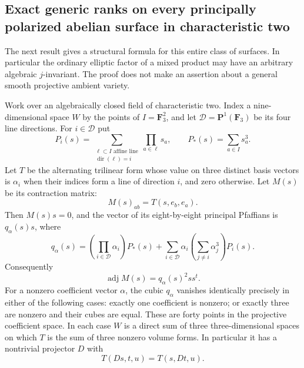 \subsection{Exact generic ranks on every principally polarized abelian surface in characteristic two}
\label{sec:DE-A3-ppav-ranks}

The next result gives a structural formula for this entire class of
surfaces.  In particular the ordinary elliptic factor of a mixed product
may have an arbitrary algebraic $j$-invariant.  The proof does not make
an assertion about a general smooth projective ambient variety.

\begin{lemma}
\label{lem:DE-A3-theta-pfaffian}
Work over an algebraically closed field of characteristic two.  Index a
nine-dimensional space $W$ by the points of $I=\mathbf F_3^2$, and let
$\mathcal D=\mathbf P^1(\mathbf F_3)$ be its four line directions.
For $i\in\mathcal D$ put
\[
 P_i(s)=\sum_{\substack{\ell\subset I\text{ affine line}\\
                         \operatorname{dir}(\ell)=i}}
                           \prod_{a\in\ell}s_a,
 \qquad P_*(s)=\sum_{a\in I}s_a^3.
\]
Let $T$ be the alternating trilinear form whose value on three distinct
basis vectors is $\alpha_i$ when their indices form a line of direction
$i$, and zero otherwise.  Let $M(s)$ be its contraction matrix:
\[
             M(s)_{ab}=T(s,e_b,e_a).
\]
Then $M(s)s=0$, and the vector of its eight-by-eight principal
Pfaffians is $q_\alpha(s)s$, where
\begin{equation}\label{eq:DE-A3-pfaffian-cubic}
 q_\alpha(s)=
   \left(\prod_{i\in\mathcal D}\alpha_i\right)P_*(s)
   +\sum_{i\in\mathcal D}
       \alpha_i\left(\sum_{j\ne i}\alpha_j^3\right)P_i(s).
\end{equation}
Consequently
\[
                \operatorname{adj}M(s)=q_\alpha(s)^2ss^t.
\]
For a nonzero coefficient vector $\alpha$, the cubic $q_\alpha$ vanishes
identically precisely in either of the following cases: exactly one
coefficient is nonzero; or exactly three are nonzero and their cubes are
equal.  These are forty points in the projective coefficient space.
In each case $W$ is a direct sum of three three-dimensional spaces on
which $T$ is the sum of three nonzero volume forms.  In particular it
has a nontrivial projector $D$ with
\[
                         T(Ds,t,u)=T(s,Dt,u).
\]
\end{lemma}
